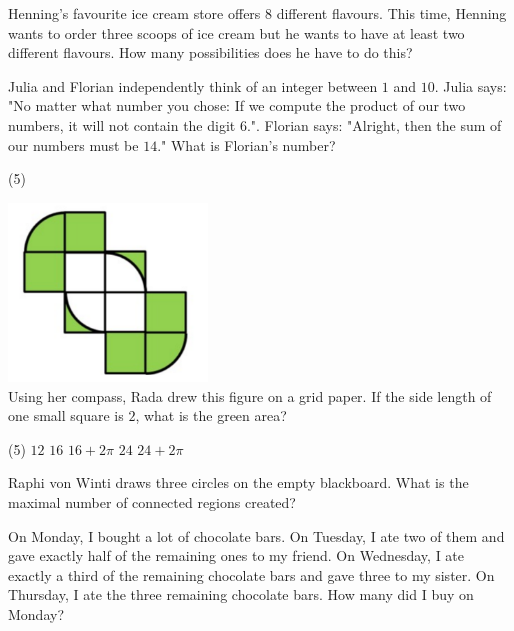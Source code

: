 \documentclass{article}
\begin{document}
\begin{problem}
Henning's favourite ice cream store offers $8$ different flavours. This time, Henning wants to order three scoops of ice cream but he wants to have at least two different flavours. How many possibilities does he have to do this?
\end{problem}

\begin{problem}
Julia and Florian independently think of an integer between $1$ and $10$. Julia says: "No matter what number you chose: If we compute the product of our two numbers, it will not contain the digit $6$.". Florian says: "Alright, then the sum of our numbers must be $14$." What is Florian's number?
\end{problem}
\begin{tasks}(5)
\end{tasks}

\begin{problem}
\includegraphics[width=150pt]{img5} \\
Using her compass, Rada drew this figure on a grid paper. If the side length of one small square is $2$, what is the green area?
\end{problem}
\begin{tasks}(5)
\task $12$
\task $16$
\task $16 + 2\pi$
\task $24$
\task $24 + 2\pi$
\end{tasks}

\begin{problem}
Raphi von Winti draws three circles on the empty blackboard. What is the maximal number of connected regions created?
\end{problem}

\begin{problem}
On Monday, I bought a lot of chocolate bars. On Tuesday, I ate two of them and gave exactly half of the remaining ones to my friend. On Wednesday, I ate exactly a third of the remaining chocolate bars and gave three to my sister. On Thursday, I ate the three remaining chocolate bars. How many did I buy on Monday?
\end{problem}
\end{document}
